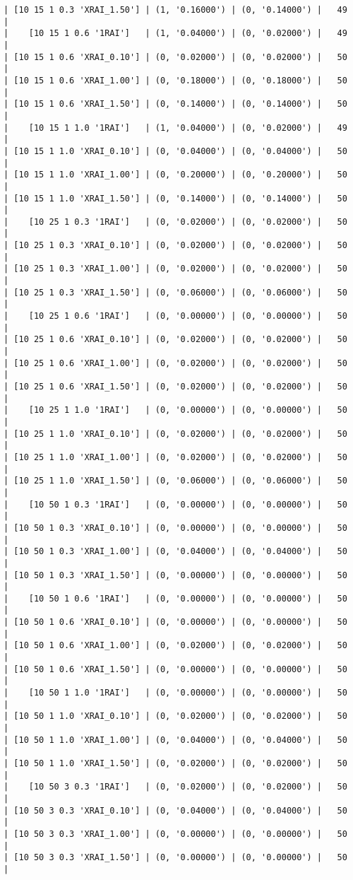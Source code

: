 \documentclass{article}
\begin{document}
\begin{verbatim}
| [10 15 1 0.3 'XRAI_1.50'] | (1, '0.16000') | (0, '0.14000') |   49  |
|    [10 15 1 0.6 '1RAI']   | (1, '0.04000') | (0, '0.02000') |   49  |
| [10 15 1 0.6 'XRAI_0.10'] | (0, '0.02000') | (0, '0.02000') |   50  |
| [10 15 1 0.6 'XRAI_1.00'] | (0, '0.18000') | (0, '0.18000') |   50  |
| [10 15 1 0.6 'XRAI_1.50'] | (0, '0.14000') | (0, '0.14000') |   50  |
|    [10 15 1 1.0 '1RAI']   | (1, '0.04000') | (0, '0.02000') |   49  |
| [10 15 1 1.0 'XRAI_0.10'] | (0, '0.04000') | (0, '0.04000') |   50  |
| [10 15 1 1.0 'XRAI_1.00'] | (0, '0.20000') | (0, '0.20000') |   50  |
| [10 15 1 1.0 'XRAI_1.50'] | (0, '0.14000') | (0, '0.14000') |   50  |
|    [10 25 1 0.3 '1RAI']   | (0, '0.02000') | (0, '0.02000') |   50  |
| [10 25 1 0.3 'XRAI_0.10'] | (0, '0.02000') | (0, '0.02000') |   50  |
| [10 25 1 0.3 'XRAI_1.00'] | (0, '0.02000') | (0, '0.02000') |   50  |
| [10 25 1 0.3 'XRAI_1.50'] | (0, '0.06000') | (0, '0.06000') |   50  |
|    [10 25 1 0.6 '1RAI']   | (0, '0.00000') | (0, '0.00000') |   50  |
| [10 25 1 0.6 'XRAI_0.10'] | (0, '0.02000') | (0, '0.02000') |   50  |
| [10 25 1 0.6 'XRAI_1.00'] | (0, '0.02000') | (0, '0.02000') |   50  |
| [10 25 1 0.6 'XRAI_1.50'] | (0, '0.02000') | (0, '0.02000') |   50  |
|    [10 25 1 1.0 '1RAI']   | (0, '0.00000') | (0, '0.00000') |   50  |
| [10 25 1 1.0 'XRAI_0.10'] | (0, '0.02000') | (0, '0.02000') |   50  |
| [10 25 1 1.0 'XRAI_1.00'] | (0, '0.02000') | (0, '0.02000') |   50  |
| [10 25 1 1.0 'XRAI_1.50'] | (0, '0.06000') | (0, '0.06000') |   50  |
|    [10 50 1 0.3 '1RAI']   | (0, '0.00000') | (0, '0.00000') |   50  |
| [10 50 1 0.3 'XRAI_0.10'] | (0, '0.00000') | (0, '0.00000') |   50  |
| [10 50 1 0.3 'XRAI_1.00'] | (0, '0.04000') | (0, '0.04000') |   50  |
| [10 50 1 0.3 'XRAI_1.50'] | (0, '0.00000') | (0, '0.00000') |   50  |
|    [10 50 1 0.6 '1RAI']   | (0, '0.00000') | (0, '0.00000') |   50  |
| [10 50 1 0.6 'XRAI_0.10'] | (0, '0.00000') | (0, '0.00000') |   50  |
| [10 50 1 0.6 'XRAI_1.00'] | (0, '0.02000') | (0, '0.02000') |   50  |
| [10 50 1 0.6 'XRAI_1.50'] | (0, '0.00000') | (0, '0.00000') |   50  |
|    [10 50 1 1.0 '1RAI']   | (0, '0.00000') | (0, '0.00000') |   50  |
| [10 50 1 1.0 'XRAI_0.10'] | (0, '0.02000') | (0, '0.02000') |   50  |
| [10 50 1 1.0 'XRAI_1.00'] | (0, '0.04000') | (0, '0.04000') |   50  |
| [10 50 1 1.0 'XRAI_1.50'] | (0, '0.02000') | (0, '0.02000') |   50  |
|    [10 50 3 0.3 '1RAI']   | (0, '0.02000') | (0, '0.02000') |   50  |
| [10 50 3 0.3 'XRAI_0.10'] | (0, '0.04000') | (0, '0.04000') |   50  |
| [10 50 3 0.3 'XRAI_1.00'] | (0, '0.00000') | (0, '0.00000') |   50  |
| [10 50 3 0.3 'XRAI_1.50'] | (0, '0.00000') | (0, '0.00000') |   50  |

\end{verbatim}
\end{document}
